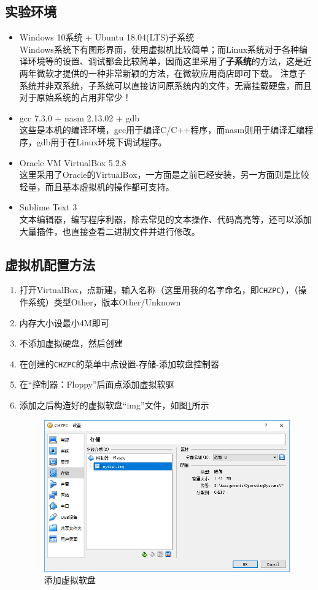 \documentclass[logo,reportComp]{thesis}
\begin{document}
\subsection{实验环境}
\begin{itemize}
	\item Windows 10系统 + Ubuntu 18.04(LTS)子系统\\
	Windows系统下有图形界面，使用虚拟机比较简单；而Linux系统对于各种编译环境等的设置、调试都会比较简单，因而这里采用了\textbf{子系统}的方法，这是近两年微软才提供的一种非常新颖的方法，在微软应用商店即可下载。
	注意子系统并非双系统，子系统可以直接访问原系统内的文件，无需挂载硬盘，而且对于原始系统的占用非常少！
	\item gcc 7.3.0 + nasm 2.13.02 + gdb\\
	这些是本机的编译环境，gcc用于编译C/C++程序，而nasm则用于编译汇编程序，gdb用于在Linux环境下调试程序。
	\item Oracle VM VirtualBox 5.2.8\\
	这里采用了Oracle的VirtualBox，一方面是之前已经安装，另一方面则是比较轻量，而且基本虚拟机的操作都可支持。
	\item Sublime Text 3\\
	文本编辑器，编写程序利器，除去常见的文本操作、代码高亮等，还可以添加大量插件，也直接查看二进制文件并进行修改。
\end{itemize}

\subsection{虚拟机配置方法}
\begin{enumerate}
	\item 打开VirtualBox，点新建，输入名称（这里用我的名字命名，即\verb'CHZPC'），（操作系统）类型Other，版本Other/Unknown
	\item 内存大小设最小4M即可
	\item 不添加虚拟硬盘，然后创建
	\item 在创建的\verb'CHZPC'的菜单中点设置-存储-添加软盘控制器
	\item 在``控制器：Floppy''后面点添加虚拟软驱
	\item 添加之后构造好的虚拟软盘``img''文件，如图\ref{fig:floppy_disk}所示
\begin{figure}[H]
\centering
\includegraphics[width=0.6\linewidth]{fig/floppy_disk.PNG}
\caption{添加虚拟软盘}
\label{fig:floppy_disk}
\end{figure}
\end{enumerate}
\end{document}
